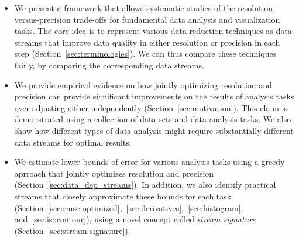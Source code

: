 \begin{itemize}
\item We present a framework that allows systematic studies of the resolution-versus-precision
  trade-offs for fundamental data analysis and visualization tasks. The core idea is to represent
  various data reduction techniques as data streams that improve data quality in either resolution
  or precision in each step (Section~\ref{sec:terminologies}). We can thus compare these techniques
  fairly, by comparing the corresponding data streams.
   
\item We provide empirical evidence on how jointly optimizing resolution and precision can provide
  significant improvements on the results of analysis tasks over adjusting either independently
  (Section~\ref{sec:motivation}). This claim is demonstrated using a collection of data sets and
  data analysis tasks. We also show how different types of data analysis might require substantially
  different data streams for optimal results.

\item We estimate lower bounds of error for various analysis tasks using a greedy aprroach that
  jointly optimizes resolution and precision (Section~\ref{sec:data_dep_streams}). In addition, we
  also identify practical streams that closely approximate these bounds for each task
  (Section~\ref{sec:rmse-optimized},~\ref{sec:derivatives},~\ref{sec:histogram},
  and~\ref{sec:isocontour}), using a novel concept called \emph{stream signature}
  (Section~\ref{sec:stream-signature}).
\end{itemize}

